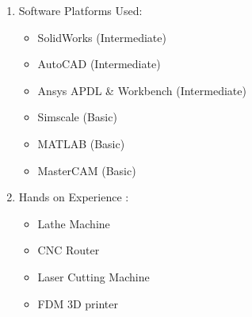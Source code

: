 \documentclass[letterpaper,11pt]{article}
\begin{document}
\begin{enumerate}
	\item Software Platforms Used:\\
	\begin{itemize}
		\item SolidWorks (Intermediate)
		\item AutoCAD (Intermediate)
		\item Ansys APDL \& Workbench  (Intermediate)
		\item Simscale (Basic)
		\item MATLAB (Basic)
		\item  MasterCAM (Basic)
	\end{itemize}
	
	\item Hands on Experience : 
	\begin{itemize}
		\item Lathe Machine
		\item CNC Router
		\item Laser Cutting Machine
		\item FDM 3D printer 
	\end{itemize}
\end{enumerate}

	
\end{document}
